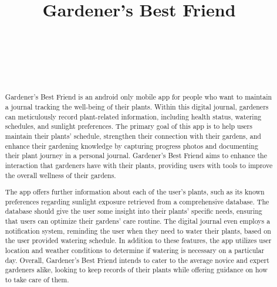 \documentclass{sigchi}
\def\plaintitle{Gardener's Best Friend}
\begin{document}
\title{\plaintitle}

\author{%
  \\
 \\
  \\
  \\
}

\maketitle

\begin{abstract}
Gardener's Best Friend is an android only mobile app for people who want to maintain a journal tracking the well-being of their plants. Within this digital journal, gardeners can meticulously record plant-related information, including health status, watering schedules, and sunlight preferences. The primary goal of this app is to help users maintain their plants' schedule, strengthen their connection with their gardens, and enhance their gardening knowledge by capturing progress photos and documenting their plant journey in a personal journal. Gardener's Best Friend aims to enhance the interaction that gardeners have with their plants, providing users with tools to improve the overall wellness of their gardens.

The app offers further information about each of the user's plants, such as its known preferences regarding sunlight exposure retrieved from a comprehensive database. The database should give the user some insight into their plants' specific needs, ensuring that users can optimize their gardens' care routine. The digital journal even employs a notification system, reminding the user when they need to water their plants, based on the user provided watering schedule. In addition to these features, the app utilizes user location and weather conditions to determine if watering is necessary on a particular day. Overall, Gardener's Best Friend intends to cater to the average novice and expert gardeners alike, looking to keep records of their plants while offering guidance on how to take care of them.

\end{abstract}
\end{document}
